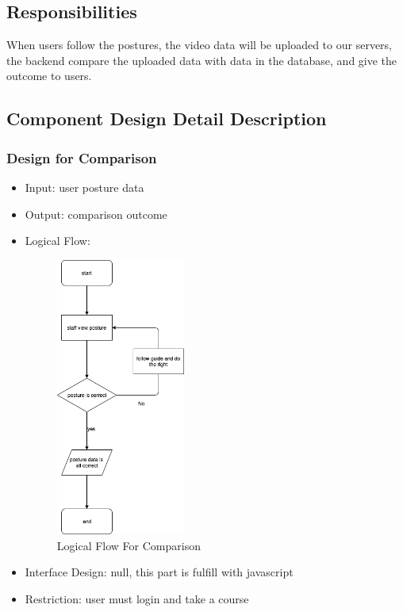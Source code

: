 \documentclass[16pt]{scrreprt}
\begin{document}
\subsection{Responsibilities}
When users follow the postures, the video data will be uploaded to our servers, the backend compare the uploaded data with data in the database, and give the outcome to users.

\subsection{Component Design Detail Description}
\subsubsection{Design for Comparison}
\begin{itemize}
    \item Input: user posture data
    \item Output: comparison outcome
    \item Logical Flow:
        \begin{figure}[H]
            \centering
            \includegraphics[width=0.4\textwidth]{diagrams/flow-comparison.png}
            \caption{Logical Flow For Comparison}
        \end{figure}
    \item Interface Design: null, this part is fulfill with javascript
    \item Restriction: user must login and take a course
\end{itemize}
\end{document}
